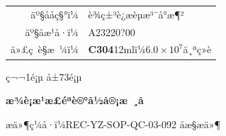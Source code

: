 \documentclass[UTF8,10pt,a4paper,fontset=fandol]{ctexart}
\newcommand{\fieldvalue}[1]{#1}
\newcommand{\handwritten}[1]{#1}
\begin{document}
\vspace{2cm}

\begin{center}
\begin{tabular}{rl}
äº§ååç§°ï¼&
\fieldvalue{è¾ç±³è¿æèµæ³¨å°æ¶²}\\[1.5em]
äº§åæ¹å·ï¼&
\fieldvalue{\handwritten{A23220?00}}\\[1.5em]
ä»£ç è§æ ¼ï¼&
\fieldvalue{\textbf{C304}\quad 12mlï¼$6.0\times 10^{7}$ä¸ªç»è}
\end{tabular}
\end{center}

\vfill

\begin{center}
ç¬¬1é¡µ å±73é¡µ
\end{center}

\newpage

\begin{center}
\textbf{æ¾è¡æ¹æ£éªè®°å½å®¡æ ¸å}
\end{center}

\noindent
æä»¶ç¼å·ï¼REC-YZ-SOP-QC-03-092 \hfill åæ§æä»¶
\end{document}

